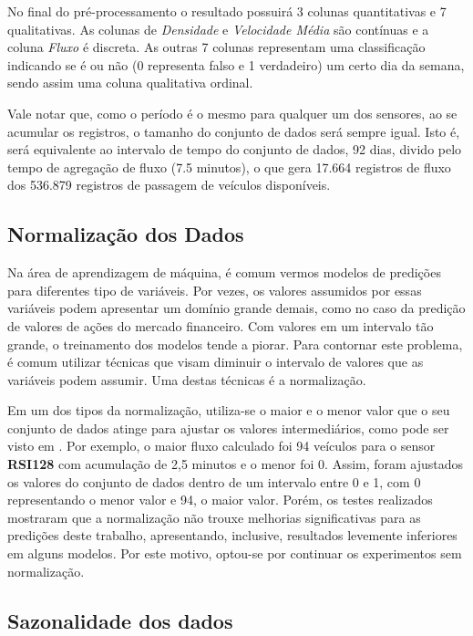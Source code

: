 No final do pré-processamento o resultado possuirá 3 colunas quantitativas e 7 qualitativas. As colunas de \textit{Densidade} e \textit{Velocidade Média} são contínuas e a coluna \textit{Fluxo} é discreta. As outras 7 colunas representam uma classificação indicando se é ou não (0 representa falso e 1 verdadeiro) um certo dia da semana, sendo assim uma coluna qualitativa ordinal.

Vale notar que, como o período é o mesmo para qualquer um dos sensores, ao se acumular os registros, o tamanho do conjunto de dados será sempre igual. Isto é, será equivalente ao intervalo de tempo do conjunto de dados, 92 dias, divido pelo tempo de agregação de fluxo (7.5 minutos), o que gera 17.664 registros de fluxo dos 536.879 registros de passagem de veículos disponíveis.

\subsection{Normalização dos Dados}

Na área de aprendizagem de máquina, é comum vermos modelos de predições para diferentes tipo de variáveis. Por vezes, os valores assumidos por essas variáveis podem apresentar um domínio grande demais, como no caso da predição de valores de ações do mercado financeiro. Com valores em um intervalo tão grande, o treinamento dos modelos tende a piorar. Para contornar este problema, é comum utilizar técnicas que visam diminuir o intervalo de valores que as variáveis podem assumir. Uma destas técnicas é a normalização. 

Em um dos tipos da normalização, utiliza-se o maior e o menor valor que o seu conjunto de dados atinge para ajustar os valores intermediários, como pode ser visto em \cite{Dorian_1999}. Por exemplo, o maior fluxo calculado foi 94 veículos para o sensor \textbf{RSI128} com acumulação de 2,5 minutos e o menor foi 0. Assim, foram ajustados os valores do conjunto de dados dentro de um intervalo entre 0 e 1, com 0 representando o menor valor e 94, o maior valor. Porém, os testes realizados mostraram que a normalização não trouxe melhorias significativas para as predições deste trabalho, apresentando, inclusive, resultados levemente inferiores em alguns modelos. Por este motivo, optou-se por continuar os experimentos sem normalização.

\subsection{Sazonalidade dos dados}

